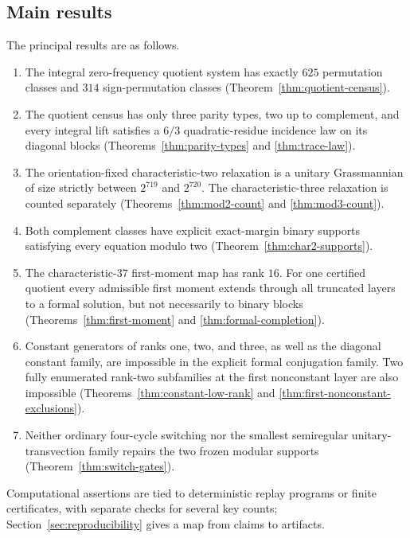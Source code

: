 \documentclass[11pt]{article}
\theoremstyle{definition}
\begin{document}
\subsection*{Main results}

The principal results are as follows.

\begin{enumerate}[label=(\roman*)]
\item The integral zero-frequency quotient system has exactly \(625\)
permutation classes and \(314\) sign-permutation classes
(Theorem~\ref{thm:quotient-census}).
\item The quotient census has only three parity types, two up to
complement, and every integral lift satisfies a \(6/3\)
quadratic-residue incidence law on its diagonal blocks
(Theorems~\ref{thm:parity-types} and \ref{thm:trace-law}).
\item The orientation-fixed characteristic-two relaxation is a
unitary Grassmannian of size strictly between \(2^{719}\) and \(2^{720}\).
The characteristic-three relaxation is counted separately
(Theorems~\ref{thm:mod2-count} and \ref{thm:mod3-count}).
\item Both complement classes have explicit exact-margin binary supports
satisfying every equation modulo two (Theorem~\ref{thm:char2-supports}).
\item The characteristic-\(37\) first-moment map has rank \(16\).  For one
certified quotient every admissible first moment extends through all
truncated layers to a formal solution, but not necessarily to binary blocks
(Theorems~\ref{thm:first-moment} and \ref{thm:formal-completion}).
\item Constant generators of ranks one, two, and three, as well as the
diagonal constant family, are impossible in the explicit formal
conjugation family.  Two fully enumerated rank-two subfamilies at the first
nonconstant layer are also impossible
(Theorems~\ref{thm:constant-low-rank} and
\ref{thm:first-nonconstant-exclusions}).
\item Neither ordinary four-cycle switching nor the smallest
semiregular unitary-transvection family repairs the two frozen modular
supports (Theorem~\ref{thm:switch-gates}).
\end{enumerate}

Computational assertions are tied to deterministic replay programs or
finite certificates, with separate checks for several key counts;
Section~\ref{sec:reproducibility} gives a map from claims to artifacts.
\end{document}
